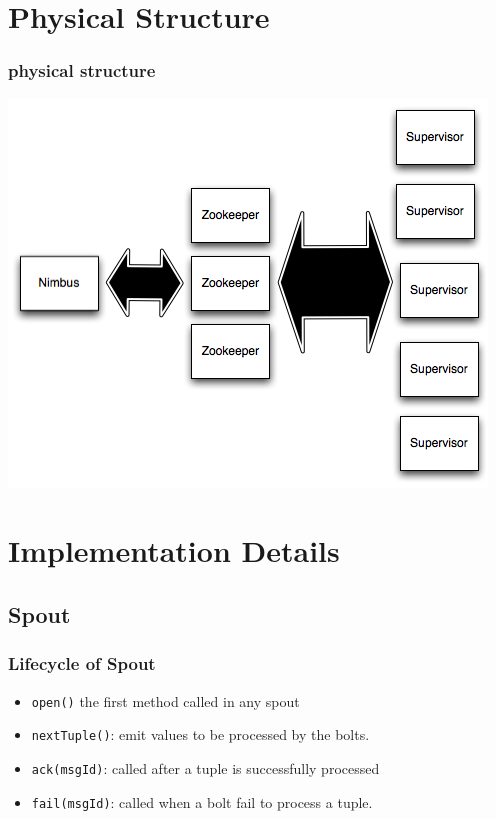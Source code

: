 \documentclass{beamer}
\begin{document}
\section{Physical Structure}
\begin{frame}
    \frametitle{physical structure}
    \includegraphics[width=\textwidth]{storm-cluster}
\end{frame}

\section{Implementation Details}
\subsection{Spout}
\begin{frame}
    \frametitle{Lifecycle of Spout}
    \begin{itemize}
        \item \texttt{open()} the first method called in any spout
        \item \texttt{nextTuple()}: emit values to be processed by the
            bolts.
        \item \texttt{ack(msgId)}: called after a tuple is successfully
            processed
        \item \texttt{fail(msgId)}: called when a bolt fail to process a
            tuple.
    \end{itemize}
\end{frame}
\end{document}
